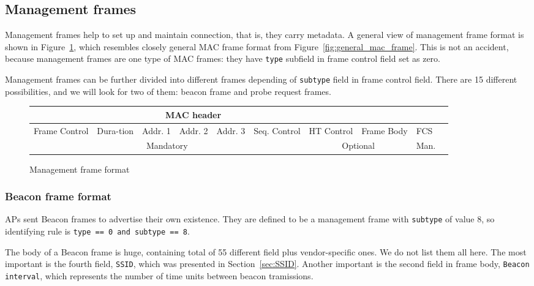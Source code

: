 \documentclass[12pt,a4paper,oneside,pdftex]{report}
\begin{document}
\subsection{Management frames}
\label{subsec:management_frames}

Management frames help to set up and maintain connection, that is, they carry metadata. A general view of management frame format is shown in Figure~\ref{fig:management_frame}, which resembles closely general MAC frame format from Figure~\ref{fig:general_mac_frame}. This is not an accident, because management frames are one type of MAC frames: they have \texttt{type} subfield in frame control field set as zero.

Management frames can be further divided into different frames depending of \texttt{subtype} field in frame control field. There are 15 different possibilities, and we will look for two of them: beacon frame and probe request frames.

\begin{figure}
    \label{fig:management_frame}
    \begin{tabular}{|p{1cm}|p{1cm}|p{1cm}|p{1cm}|p{1cm}|p{1cm}|p{1cm}|p{1cm}|p{1cm}|p{1cm}|}
    
        \multicolumn{7}{|c|}{MAC header} &
        \multicolumn{2}{c|}{ } \\
    \hline 
        Frame Control &
        Dura-tion &
        Addr. 1 &
        Addr. 2 &
        Addr. 3 &
        Seq. Control &
        HT Control &
        Frame Body &
        FCS \\
    \hline 
        \multicolumn{6}{|c|}{Mandatory} &
        \multicolumn{2}{c|}{Optional} &
        Man. \\

    \end{tabular}

    \caption{Management frame format}
\end{figure}

\subsubsection{Beacon frame format}
\label{subsubsec:beacon_frame}

APs sent Beacon frames to advertise their own existence. They are defined to be a management frame with \texttt{subtype} of value 8, so identifying rule is \texttt{type == 0 and subtype == 8}.

The body of a Beacon frame is huge, containing total of 55 different field plus vendor-specific ones. We do not list them all here. The most important is the fourth field, \texttt{SSID}, which was presented in Section~\ref{sec:SSID}. Another important is the second field in frame body, \texttt{Beacon interval}, which represents the number of time units between beacon tramissions.
\end{document}
